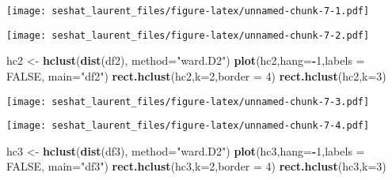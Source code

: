 \documentclass[
]{article}
\newenvironment{Shaded}{\begin{snugshade}}{\end{snugshade}}
\newcommand{\DataTypeTok}[1]{\textcolor[rgb]{0.13,0.29,0.53}{#1}}
\newcommand{\DecValTok}[1]{\textcolor[rgb]{0.00,0.00,0.81}{#1}}
\newcommand{\KeywordTok}[1]{\textcolor[rgb]{0.13,0.29,0.53}{\textbf{#1}}}
\newcommand{\NormalTok}[1]{#1}
\newcommand{\OperatorTok}[1]{\textcolor[rgb]{0.81,0.36,0.00}{\textbf{#1}}}
\newcommand{\OtherTok}[1]{\textcolor[rgb]{0.56,0.35,0.01}{#1}}
\newcommand{\StringTok}[1]{\textcolor[rgb]{0.31,0.60,0.02}{#1}}
\begin{document}
\texttt{[image: seshat\_laurent\_files/figure-latex/unnamed-chunk-7-1.pdf]}

\begin{Shaded}
\end{Shaded}

\texttt{[image: seshat\_laurent\_files/figure-latex/unnamed-chunk-7-2.pdf]}

\begin{Shaded}
\begin{Highlighting}[]
\NormalTok{hc2 <-}\StringTok{ }\KeywordTok{hclust}\NormalTok{(}\KeywordTok{dist}\NormalTok{(df2), }\DataTypeTok{method=}\StringTok{"ward.D2"}\NormalTok{)}
\KeywordTok{plot}\NormalTok{(hc2,}\DataTypeTok{hang=}\OperatorTok{-}\DecValTok{1}\NormalTok{,}\DataTypeTok{labels =} \OtherTok{FALSE}\NormalTok{, }\DataTypeTok{main=}\StringTok{"df2"}\NormalTok{)}
\KeywordTok{rect.hclust}\NormalTok{(hc2,}\DataTypeTok{k=}\DecValTok{2}\NormalTok{,}\DataTypeTok{border =} \DecValTok{4}\NormalTok{)}
\KeywordTok{rect.hclust}\NormalTok{(hc2,}\DataTypeTok{k=}\DecValTok{3}\NormalTok{)}
\end{Highlighting}
\end{Shaded}

\texttt{[image: seshat\_laurent\_files/figure-latex/unnamed-chunk-7-3.pdf]}

\begin{Shaded}
\end{Shaded}

\texttt{[image: seshat\_laurent\_files/figure-latex/unnamed-chunk-7-4.pdf]}

\begin{Shaded}
\begin{Highlighting}[]
\NormalTok{hc3 <-}\StringTok{ }\KeywordTok{hclust}\NormalTok{(}\KeywordTok{dist}\NormalTok{(df3), }\DataTypeTok{method=}\StringTok{"ward.D2"}\NormalTok{)}
\KeywordTok{plot}\NormalTok{(hc3,}\DataTypeTok{hang=}\OperatorTok{-}\DecValTok{1}\NormalTok{,}\DataTypeTok{labels =} \OtherTok{FALSE}\NormalTok{, }\DataTypeTok{main=}\StringTok{"df3"}\NormalTok{)}
\KeywordTok{rect.hclust}\NormalTok{(hc3,}\DataTypeTok{k=}\DecValTok{2}\NormalTok{,}\DataTypeTok{border =} \DecValTok{4}\NormalTok{)}
\KeywordTok{rect.hclust}\NormalTok{(hc3,}\DataTypeTok{k=}\DecValTok{3}\NormalTok{)}
\end{Highlighting}
\end{Shaded}
\end{document}
